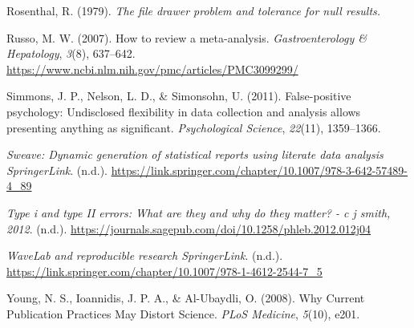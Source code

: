 \documentclass[
  british,
  a4paper,
]{article}
\newlength{\cslhangindent}
\newenvironment{CSLReferences}[2] %
 {\begin{list}{}{%
  \setlength{\itemindent}{0pt}
  \setlength{\leftmargin}{0pt}
  \setlength{\parsep}{0pt}
  \ifodd #1
   \setlength{\leftmargin}{\cslhangindent}
   \setlength{\itemindent}{-1\cslhangindent}
  \fi
  \setlength{\itemsep}{#2\baselineskip}}}
 {\end{list}}
\begin{document}
\begin{CSLReferences}{1}{0}
Rosenthal, R. (1979). \emph{The file drawer problem and tolerance for
null results.}

Russo, M. W. (2007). How to review a meta-analysis.
\emph{Gastroenterology \& Hepatology}, \emph{3}(8), 637--642.
\url{https://www.ncbi.nlm.nih.gov/pmc/articles/PMC3099299/}

Simmons, J. P., Nelson, L. D., \& Simonsohn, U. (2011). False-positive
psychology: {Undisclosed} flexibility in data collection and analysis
allows presenting anything as significant. \emph{Psychological Science},
\emph{22}(11), 1359--1366.

\emph{Sweave: Dynamic generation of statistical reports using literate
data analysis \textbar{} SpringerLink}. (n.d.).
\url{https://link.springer.com/chapter/10.1007/978-3-642-57489-4_89}

\emph{Type i and type II errors: What are they and why do they matter? -
c j smith, 2012}. (n.d.).
\url{https://journals.sagepub.com/doi/10.1258/phleb.2012.012j04}

\emph{WaveLab and reproducible research \textbar{} SpringerLink}.
(n.d.).
\url{https://link.springer.com/chapter/10.1007/978-1-4612-2544-7_5}

Young, N. S., Ioannidis, J. P. A., \& Al-Ubaydli, O. (2008). Why
{Current Publication Practices May Distort Science}. \emph{PLoS
Medicine}, \emph{5}(10), e201.

\end{CSLReferences}
\end{document}
